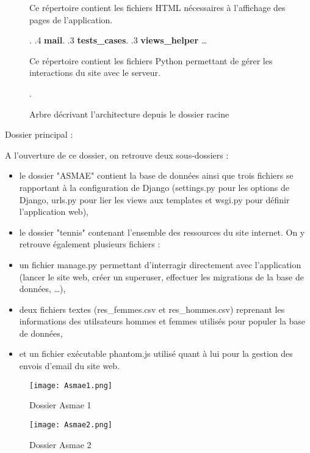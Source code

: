 \begin{figure}[!ht]
\begin{framed}
{\begin{minipage}[t]{10cm}
									Ce répertoire contient les fichiers
									HTML nécessaires à l'affichage des pages
									de l'application{.}
									\end{minipage}.
			.4 \textbf{mail}.
			.3 \textbf{tests\_cases}.
			.3 \textbf{views\_helper} \ldots{} \begin{minipage}[t]{10cm}
									Ce répertoire contient les fichiers
									Python permettant de gérer les interactions
									du site avec le serveur{.}
									\end{minipage}.
		}
	\end{framed}
	\caption{Arbre décrivant l'architecture depuis le dossier racine}
	\label{fig:Architecture des dossiers}
\end{figure}
\FloatBarrier

Dossier principal :\newline

A l'ouverture de ce dossier, on retrouve deux sous-dossiers : \newline

\begin{itemize}
	\item le dossier "ASMAE" contient  la base de données ainsi que trois fichiers se rapportant à la configuration de Django (settings.py pour les options de Django, urls.py pour lier les views aux templates et wsgi.py pour définir l'application web),
	\item le dossier "tennis" contenant l'ensemble des ressources du site internet. On y retrouve également plusieurs fichiers :
	\item un fichier manage.py permettant d'interragir directement avec l'application (lancer le site web, créer un superuser, effectuer les migrations de la base de données, …),
	\item deux fichiers textes (res\_femmes.csv et res\_hommes.csv) reprenant les informations des utilsateurs hommes et femmes utilisés pour populer la base de données,
	\item et un fichier exécutable phantom.js utilisé quant à lui pour la gestion des envois d'email du site web.
\end{itemize}

\begin{figure}[!ht]
\centering
\texttt{[image: Asmae1.png]}
\caption{Dossier Asmae 1}
\end{figure}
\FloatBarrier

\begin{figure}[!ht]
\centering
\texttt{[image: Asmae2.png]}
\caption{Dossier Asmae 2}
\end{figure}
\FloatBarrier

